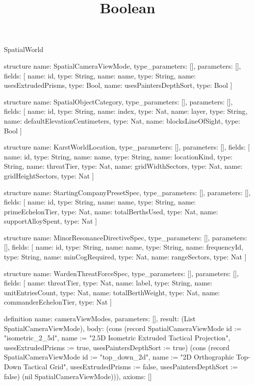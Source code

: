 \begin{lexlean}{SpatialWorld}
\title{Boolean}
\begin{semanticmodule}
structure{
  name: SpatialCameraViewMode,
  type_parameters: [],
  parameters: [],
  fields: [
    {name: id, type: String},
    {name: name, type: String},
    {name: usesExtrudedPrisms, type: Bool},
    {name: usesPaintersDepthSort, type: Bool}
  ]
}

structure{
  name: SpatialObjectCategory,
  type_parameters: [],
  parameters: [],
  fields: [
    {name: id, type: String},
    {name: index, type: Nat},
    {name: layer, type: String},
    {name: defaultElevationCentimeters, type: Nat},
    {name: blocksLineOfSight, type: Bool}
  ]
}

structure{
  name: KarstWorldLocation,
  type_parameters: [],
  parameters: [],
  fields: [
    {name: id, type: String},
    {name: name, type: String},
    {name: locationKind, type: String},
    {name: threatTier, type: Nat},
    {name: gridWidthSectors, type: Nat},
    {name: gridHeightSectors, type: Nat}
  ]
}

structure{
  name: StartingCompanyPresetSpec,
  type_parameters: [],
  parameters: [],
  fields: [
    {name: id, type: String},
    {name: name, type: String},
    {name: primeEchelonTier, type: Nat},
    {name: totalBerthsUsed, type: Nat},
    {name: supportAlloySpent, type: Nat}
  ]
}

structure{
  name: MinorResonanceDirectiveSpec,
  type_parameters: [],
  parameters: [],
  fields: [
    {name: id, type: String},
    {name: name, type: String},
    {name: frequencyId, type: String},
    {name: minCogRequired, type: Nat},
    {name: rangeSectors, type: Nat}
  ]
}

structure{
  name: WardenThreatForceSpec,
  type_parameters: [],
  parameters: [],
  fields: [
    {name: threatTier, type: Nat},
    {name: label, type: String},
    {name: unitEntriesCount, type: Nat},
    {name: totalBerthWeight, type: Nat},
    {name: commanderEchelonTier, type: Nat}
  ]
}

definition{
  name: cameraViewModes,
  parameters: [],
  result: (List SpatialCameraViewMode),
  body: (cons (record SpatialCameraViewMode {id := "isometric_2_5d", name := "2.5D Isometric Extruded Tactical Projection", usesExtrudedPrisms := true, usesPaintersDepthSort := true}) (cons (record SpatialCameraViewMode {id := "top_down_2d", name := "2D Orthographic Top-Down Tactical Grid", usesExtrudedPrisms := false, usesPaintersDepthSort := false}) (nil SpatialCameraViewMode))),
  axioms: []
}


\end{semanticmodule}
\end{lexlean}
